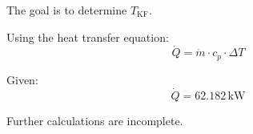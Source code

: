 The goal is to determine \( T_{\text{KF}} \).  

Using the heat transfer equation:  
\[
\dot{Q} = \dot{m} \cdot c_p \cdot \Delta T
\]  

Given:  
\[
\dot{Q} = 62.182 \, \text{kW}
\]  

Further calculations are incomplete.
